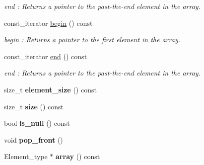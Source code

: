 \begin{DoxyCompactItemize}
\begin{DoxyCompactList}\small\item\em end \+: Returns a pointer to the past-\/the-\/end element in the array. \end{DoxyCompactList}\item 
\mbox{\label{classBounds__checked__array_a9ff9973bca8b4b03f82a46357b76287c}} 
const\+\_\+iterator \mbox{\hyperlink{classBounds__checked__array_a9ff9973bca8b4b03f82a46357b76287c}{begin}} () const
\begin{DoxyCompactList}\small\item\em begin \+: Returns a pointer to the first element in the array. \end{DoxyCompactList}\item 
\mbox{\label{classBounds__checked__array_a70551ed9cc5c0da8face44d8c70850a1}} 
const\+\_\+iterator \mbox{\hyperlink{classBounds__checked__array_a70551ed9cc5c0da8face44d8c70850a1}{end}} () const
\begin{DoxyCompactList}\small\item\em end \+: Returns a pointer to the past-\/the-\/end element in the array. \end{DoxyCompactList}\item 
\mbox{\label{classBounds__checked__array_a8719ec7e41833b1a247fa9ded0cfcee0}} 
size\+\_\+t {\bfseries element\+\_\+size} () const
\item 
\mbox{\label{classBounds__checked__array_a83d85b517c763f4dc3045712cef1c204}} 
size\+\_\+t {\bfseries size} () const
\item 
\mbox{\label{classBounds__checked__array_a4f893071e22acc57a0da477f3798d414}} 
bool {\bfseries is\+\_\+null} () const
\item 
\mbox{\label{classBounds__checked__array_a9f76e624ca54e9699be0f8b1b105a149}} 
void {\bfseries pop\+\_\+front} ()
\item 
\mbox{\label{classBounds__checked__array_af695f54f6ef9fd3468214f9e932d707d}} 
Element\+\_\+type $\ast$ {\bfseries array} () const
\item 

\end{DoxyCompactItemize}

